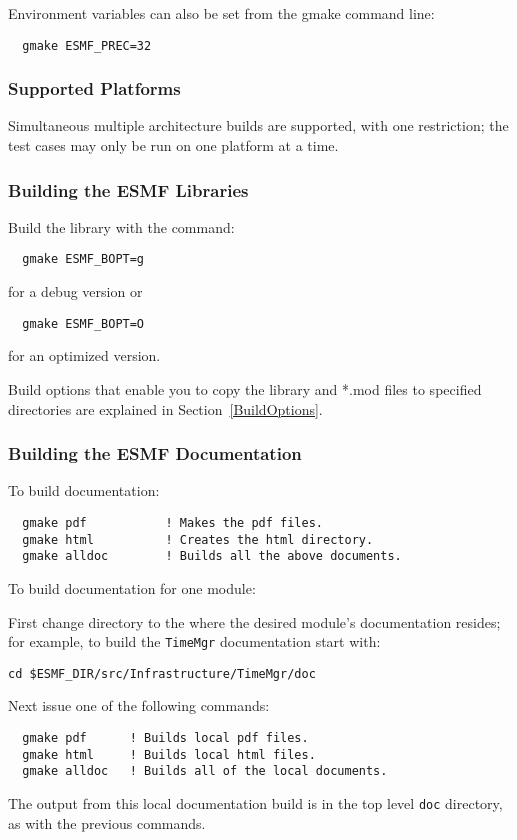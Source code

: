 Environment variables can also be set from the gmake command line:
\begin{verbatim}
  gmake ESMF_PREC=32
\end{verbatim}

\subsubsection{Supported Platforms}


Simultaneous multiple architecture builds are supported, with
one restriction; the test cases may only be run on one platform at a time. 

\subsubsection{Building the ESMF Libraries}
\label{BuildESMF}



Build the library with the command:
\begin{verbatim}
  gmake ESMF_BOPT=g  
\end{verbatim}
  for a debug version or
\begin{verbatim}
  gmake ESMF_BOPT=O  
\end{verbatim}
  for an optimized version.


Build options that enable you to copy the library and *.mod files to
specified directories are explained in Section~\ref{BuildOptions}. 

\subsubsection{Building the ESMF Documentation}
\label{BuildDocumentation}

\noindent To build documentation:
\begin{verbatim}
  gmake pdf           ! Makes the pdf files.
  gmake html          ! Creates the html directory.
  gmake alldoc        ! Builds all the above documents.
\end{verbatim}

\noindent To build documentation for one module:

\noindent First change directory to the where the desired module's documentation 
resides; for example, to build the {\tt TimeMgr} documentation start
with:

\begin{verbatim}
cd $ESMF_DIR/src/Infrastructure/TimeMgr/doc
\end{verbatim}

\noindent Next issue one of the following commands:
\begin{verbatim}
  gmake pdf      ! Builds local pdf files.
  gmake html     ! Builds local html files.
  gmake alldoc   ! Builds all of the local documents.
\end{verbatim}

\noindent The output from this local documentation build is in the top 
level {\tt doc} directory, as with the previous commands.






